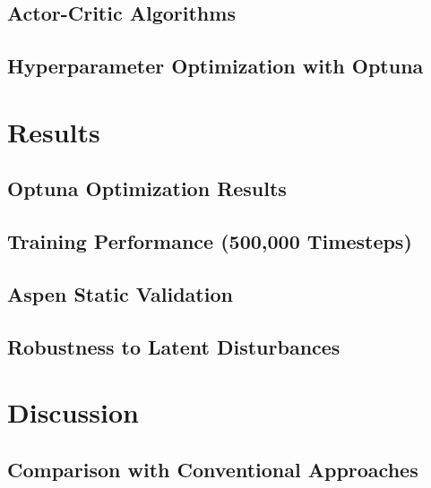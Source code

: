 \documentclass[journal,10pt,twocolumn]{IEEEtran}
\begin{document}

\subsection{Actor-Critic Algorithms}
\label{ssec:algorithms}


\subsection{Hyperparameter Optimization with Optuna}
\label{ssec:optuna}


\section{Results}
\label{sec:results}

\subsection{Optuna Optimization Results}
\label{ssec:optuna_results}


\subsection{Training Performance (500,000 Timesteps)}
\label{ssec:training}


\subsection{Aspen Static Validation}
\label{ssec:aspen}


\subsection{Robustness to Latent Disturbances}
\label{ssec:robustness}


\section{Discussion}
\label{sec:discussion}

\subsection{Comparison with Conventional Approaches}
\end{document}
